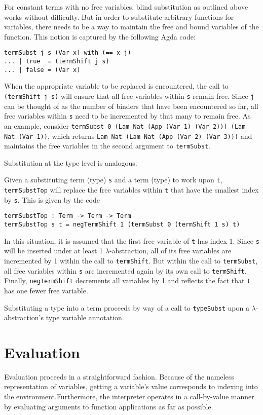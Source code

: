 \documentclass{amsart}
\begin{document}
For constant terms with no free variables, blind substitution as outlined
above works without difficulty.  But in order to substitute arbitrary
functions for variables, there needs to be a way to maintain the free and
bound variables of the function.  This notion is captured by the following
Agda code:
\begin{verbatim}
termSubst j s (Var x) with (== x j)
... | true  = (termShift j s)
... | false = (Var x)
\end{verbatim}
When the appropriate variable to be replaced is encountered, the call to
\texttt{(termShift j s)} will ensure that all free variables within \texttt{s}
remain free.  Since \texttt{j} can be thought of as the number of binders that
have been encountered so far, all free variables within \texttt{s} need to be
incremented by that many to remain free.  As an example, consider
\texttt{termSubst 0 (Lam Nat (App (Var 1) (Var 2))) (Lam Nat (Var 1))}, which
returns \texttt{Lam Nat (Lam Nat (App (Var 2) (Var 3)))} and maintains the
free variables in the second argument to \texttt{termSubst}.

Substitution at the type level is analogous.

Given a substituting term (type) \texttt{s} and a term (type) to work upon
\texttt{t}, \texttt{termSubstTop} will replace the free variables within
\texttt{t} that have the smallest index by \texttt{s}.  This is given by the
code
\begin{verbatim}
termSubstTop : Term -> Term -> Term
termSubstTop s t = negTermShift 1 (termSubst 0 (termShift 1 s) t)
\end{verbatim}
In this situation, it is assumed that the first free variable of \texttt{t}
has index 1.  Since \texttt{s} will be inserted under at least
1 $\lambda$-abstraction, all of its free variables are incremented by 1 within
the call to \texttt{termShift}.  But within the call to \texttt{termSubst},
all free variables within \texttt{s} are incremented again by its own call to
\texttt{termShift}.  Finally, \texttt{negTermShift} decrements all variables
by 1 and reflects the fact that \texttt{t} has one fewer free variable.

Substituting a type into a term proceeds by way of a call to
\texttt{typeSubst} upon a $\lambda$-abstraction's type variable annotation.

\section{Evaluation}
Evaluation proceeds in a straightforward fashion.  Because of the nameless
representation of variables, getting a variable's value corresponds to
indexing into the environment.Furthermore, the interpreter operates in
a call-by-value manner by evaluating arguments to function applications as far
as possible.
\end{document}
